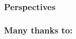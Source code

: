 \begin{frame}
 \frametitle{Perspectives}
 \centering
\end{frame}

\begin{frame}
 \frametitle{Many thanks to:}
 \centering
\end{frame}


